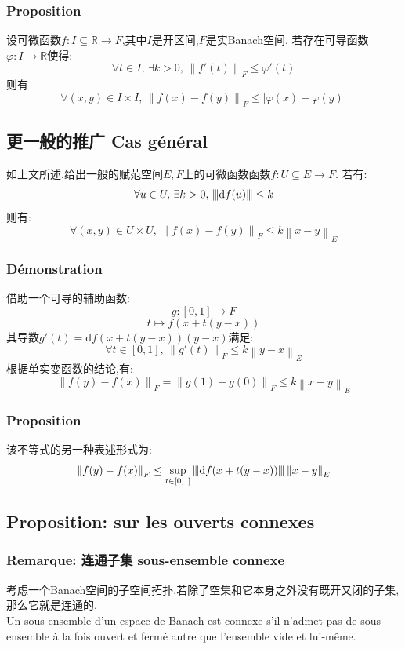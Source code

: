 \documentclass[12pt, a4paper, oneside]{ctexbook}
\newcommand{\di }{\text{d}}%
\newcommand{\R }{\mathbb{R}}%
\newcommand{\fai }{\varphi}%
\newcommand{\normmm}[1]{{\left\vert\kern-0.25ex\left\vert\kern-0.25ex\left\vert #1 
   \right\vert\kern-0.25ex\right\vert\kern-0.25ex\right\vert}}%
\begin{document}
\subsubsection{Proposition}
  设可微函数$f:I\subseteq \R\rightarrow F$,其中$I$是开区间,$F$是实Banach空间.
  若存在可导函数$\fai: I\rightarrow \R$使得:
  $$
  \forall t\in I,\,\exists k>0,\, \left\lVert f'(t)\right\rVert _F\leq \fai'(t)
  $$
  则有
  $$
  \forall(x,y)\in I\times I,\,\left\lVert f(x)-f(y)\right\rVert _F\leq \left\lvert \fai(x)-\fai(y)\right\rvert 
  $$
  \subsection{更一般的推广 Cas général}
  如上文所述,给出一般的赋范空间$E,F$上的可微函数函数$f:U\subseteq E\rightarrow F$.
  若有:
  $$
  \forall u\in U,\,\exists k>0,\,\normmm{\di f(u)}\leq k 
  $$
  则有:
  $$
  \forall(x,y)\in U\times U,\,\left\lVert f(x)-f(y)\right\rVert _F\leq k\left\lVert x-y\right\rVert _E
  $$
  \subsubsection{Démonstration}\noindent
  借助一个可导的辅助函数:
  $$
    g:[0,1]\rightarrow F
  $$
  $$
    t\mapsto f(x+t(y-x))
  $$
  其导数$g'(t)=\di f(x+t(y-x))(y-x)$满足:
  $$
  \forall t\in[0,1],\,\left\lVert g'(t)\right\rVert _F\leq k\left\lVert y-x\right\rVert _E
  $$
  根据单实变函数的结论,有:
  $$
  \left\lVert f(y)-f(x)\right\rVert _F=\left\lVert g(1)-g(0)\right\rVert _F\leq k\left\lVert x-y\right\rVert _E
  $$
  \subsubsection{Proposition}
  该不等式的另一种表述形式为:
  $$
  \left\lVert f(y)-f(x)\right\rVert _F\leq \sup_{t\in[0,1]}\normmm{\di f(x+t(y-x))}\left\lVert x-y\right\rVert _E
  $$
  \subsection{Proposition: sur les ouverts connexes}
    \subsubsection{Remarque: 连通子集 sous-ensemble connexe}
    考虑一个Banach空间的子空间拓扑,若除了空集和它本身之外没有既开又闭的子集,那么它就是连通的.\\
    \indent
    Un sous-ensemble d'un espace de Banach est connexe s'il n'admet pas de sous-ensemble à la fois ouvert et fermé autre que l'ensemble vide et lui-même.
\end{document}
